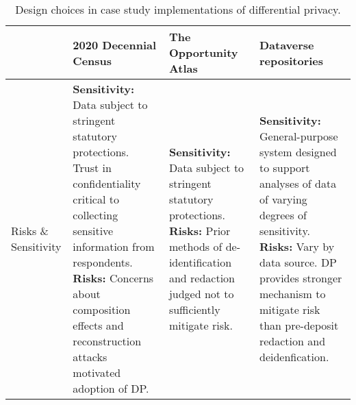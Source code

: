 \begin{table}[p]
\caption{\label{table:casestudies} Design choices in case study implementations of differential privacy.}
\fontsize{7.5}{8.5}\selectfont
\begin{tabularx}{1\textwidth}{P{.45in}YYY}

\toprule
& 2020 Decennial Census & The Opportunity Atlas & Dataverse repositories\\
\midrule
Risks \& Sensitivity & \textbf{Sensitivity:} Data subject to stringent statutory protections. Trust in confidentiality critical to collecting sensitive information from respondents.\newline
\textbf{Risks:} Concerns about composition effects and reconstruction attacks motivated adoption of DP. &
\textbf{Sensitivity:} Data subject to stringent statutory protections.\newline
\textbf{Risks:} Prior methods of de-identification and redaction judged not to sufficiently mitigate risk. &
\textbf{Sensitivity:} General-purpose system designed to support analyses of data of varying degrees of sensitivity.\newline
\textbf{Risks:} Vary by data source. DP provides stronger mechanism to mitigate risk than pre-deposit redaction and deidenfication. \\


\end{tabularx}
\end{table}
